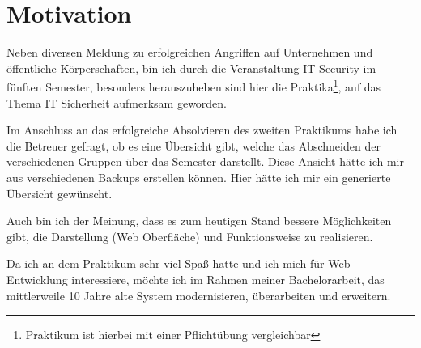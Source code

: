 \section{Motivation}
\label{sec:Motivation}
Neben diversen Meldung zu erfolgreichen Angriffen auf Unternehmen und öffentliche Körperschaften, bin ich durch die Veranstaltung IT-Security im fünften Semester, besonders herauszuheben sind hier die Praktika\footnote{Praktikum ist hierbei mit einer Pflichtübung vergleichbar}, auf das Thema IT Sicherheit aufmerksam geworden. 

Im Anschluss an das erfolgreiche Absolvieren des zweiten Praktikums  habe ich die Betreuer gefragt, ob es eine Übersicht gibt, welche das Abschneiden der verschiedenen Gruppen über das Semester darstellt.
Diese Ansicht hätte ich mir aus verschiedenen Backups erstellen können. Hier hätte ich mir ein generierte Übersicht gewünscht.

Auch bin ich der Meinung, dass es zum heutigen Stand bessere Möglichkeiten gibt, die Darstellung (Web Oberfläche) und Funktionsweise zu realisieren. 

Da ich an dem Praktikum sehr viel Spaß hatte und ich mich für Web-Entwicklung interessiere, möchte ich im Rahmen meiner Bachelorarbeit, das mittlerweile 10 Jahre alte System modernisieren, überarbeiten und erweitern.